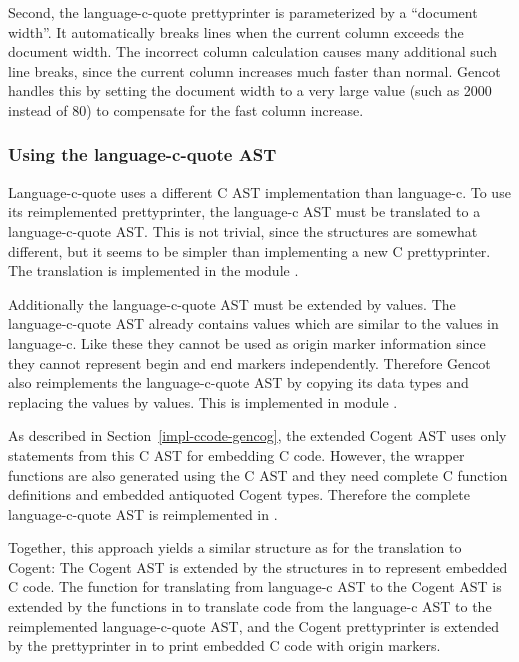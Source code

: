 Second, the language-c-quote prettyprinter is parameterized by a ``document width''. It automatically breaks lines 
when the current column exceeds the document width. The incorrect column calculation causes many additional such
line breaks, since the current column increases much faster than normal. Gencot handles this by setting the document
width to a very large value (such as 2000 instead of 80) to compensate for the fast column increase.

\subsubsection{Using the language-c-quote AST}

Language-c-quote uses a different C AST implementation than language-c. To use its reimplemented prettyprinter, the 
language-c AST must be translated to a language-c-quote AST. This is not trivial, since the structures are somewhat
different, but it seems to be simpler than implementing a new C prettyprinter. The translation is implemented in
the module . 

Additionally the language-c-quote AST must be extended by  values. The language-c-quote AST already 
contains  values which are similar to the  values in language-c. Like these they cannot
be used as origin marker information since they cannot represent begin and end markers independently. Therefore
Gencot also reimplements the language-c-quote AST by copying its data types and replacing the 
values by  values. This is implemented in module .

As described in Section~\ref{impl-ccode-gencog}, the extended Cogent AST uses only statements from
this C AST for embedding C code. However, the wrapper functions are also generated using the C AST and they 
need complete C function definitions and embedded antiquoted Cogent types. Therefore the complete 
language-c-quote AST is reimplemented in .

Together, this approach yields a similar structure as for the translation to Cogent: The Cogent AST is extended 
by the structures in  to represent embedded C code. The function for
translating from language-c AST to the Cogent AST is extended by the functions in  to
translate code from the language-c AST to the reimplemented language-c-quote 
AST, and the Cogent prettyprinter is extended by the prettyprinter
in  to print embedded C code with origin markers.

